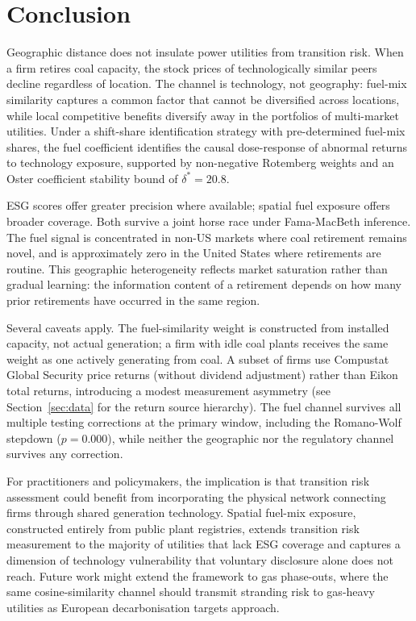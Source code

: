 \documentclass[12pt,a4paper]{article}
\begin{document}
\section{Conclusion}\label{sec:conclusion}

Geographic distance does not insulate power utilities from transition risk. When a firm retires coal capacity, the stock prices of technologically similar peers decline regardless of location. The channel is technology, not geography: fuel-mix similarity captures a common factor that cannot be diversified across locations, while local competitive benefits diversify away in the portfolios of multi-market utilities. Under a shift-share identification strategy with pre-determined fuel-mix shares, the fuel coefficient identifies the causal dose-response of abnormal returns to technology exposure, supported by non-negative Rotemberg weights and an Oster coefficient stability bound of $\delta^* = 20.8$.

ESG scores offer greater precision where available; spatial fuel exposure offers broader coverage. Both survive a joint horse race under Fama-MacBeth inference. The fuel signal is concentrated in non-US markets where coal retirement remains novel, and is approximately zero in the United States where retirements are routine. This geographic heterogeneity reflects market saturation rather than gradual learning: the information content of a retirement depends on how many prior retirements have occurred in the same region.

Several caveats apply. The fuel-similarity weight is constructed from installed capacity, not actual generation; a firm with idle coal plants receives the same weight as one actively generating from coal. A subset of firms use Compustat Global Security price returns (without dividend adjustment) rather than Eikon total returns, introducing a modest measurement asymmetry (see Section~\ref{sec:data} for the return source hierarchy). The fuel channel survives all multiple testing corrections at the primary window, including the Romano-Wolf stepdown ($p = 0.000$), while neither the geographic nor the regulatory channel survives any correction.

For practitioners and policymakers, the implication is that transition risk assessment could benefit from incorporating the physical network connecting firms through shared generation technology. Spatial fuel-mix exposure, constructed entirely from public plant registries, extends transition risk measurement to the majority of utilities that lack ESG coverage and captures a dimension of technology vulnerability that voluntary disclosure alone does not reach. Future work might extend the framework to gas phase-outs, where the same cosine-similarity channel should transmit stranding risk to gas-heavy utilities as European decarbonisation targets approach.
\end{document}

